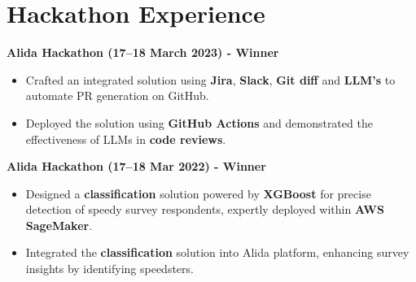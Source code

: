 \documentclass[10pt,a4paper]{article}
\begin{document}
\section{Hackathon Experience}

\noindent\textbf{Alida Hackathon (17--18 March 2023) - Winner}
\begin{itemize}[leftmargin=*, itemsep=1pt, label=\textbullet]
  \item Crafted an integrated solution using \textbf{Jira}, \textbf{Slack}, \textbf{Git diff} and \textbf{LLM's} to automate PR generation on GitHub.
  \item Deployed the solution using \textbf{GitHub Actions} and demonstrated the effectiveness of LLMs in \textbf{code reviews}.
\end{itemize}

\noindent\textbf{Alida Hackathon (17--18 Mar 2022) - Winner}
\begin{itemize}[leftmargin=*, itemsep=1pt, label=\textbullet]
  \item Designed a \textbf{classification} solution powered by \textbf{XGBoost} for precise detection of speedy survey respondents, expertly deployed within \textbf{AWS SageMaker}.
  \item Integrated the \textbf{classification} solution into Alida platform, enhancing survey insights by identifying speedsters.
\end{itemize}
\end{document}
